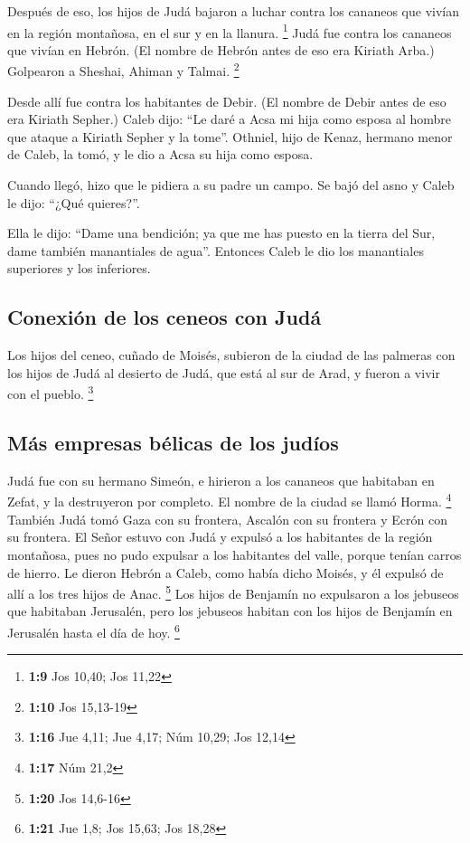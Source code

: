  Después de eso, los hijos de Judá bajaron a luchar contra
los cananeos que vivían en la región montañosa, en el sur y en la
llanura. \footnote{\textbf{1:9} Jos 10,40; Jos 11,22} 
Judá fue contra los cananeos que vivían en Hebrón. (El nombre de Hebrón
antes de eso era Kiriath Arba.) Golpearon a Sheshai, Ahiman y Talmai.
\footnote{\textbf{1:10} Jos 15,13-19}

 Desde allí fue contra los habitantes de Debir. (El
nombre de Debir antes de eso era Kiriath Sepher.)  Caleb
dijo: ``Le daré a Acsa mi hija como esposa al hombre que ataque a
Kiriath Sepher y la tome''.  Othniel, hijo de Kenaz,
hermano menor de Caleb, la tomó, y le dio a Acsa su hija como esposa.

 Cuando llegó, hizo que le pidiera a su padre un campo.
Se bajó del asno y Caleb le dijo: ``¿Qué quieres?''.

 Ella le dijo: ``Dame una bendición; ya que me has puesto
en la tierra del Sur, dame también manantiales de agua''. Entonces Caleb
le dio los manantiales superiores y los inferiores.

\hypertarget{conexiuxf3n-de-los-ceneos-con-juduxe1}{%
\subsection{Conexión de los ceneos con
Judá}\label{conexiuxf3n-de-los-ceneos-con-juduxe1}}

 Los hijos del ceneo, cuñado de Moisés, subieron de la
ciudad de las palmeras con los hijos de Judá al desierto de Judá, que
está al sur de Arad, y fueron a vivir con el pueblo. \footnote{\textbf{1:16}
  Jue 4,11; Jue 4,17; Núm 10,29; Jos 12,14}

\hypertarget{muxe1s-empresas-buxe9licas-de-los-juduxedos}{%
\subsection{Más empresas bélicas de los
judíos}\label{muxe1s-empresas-buxe9licas-de-los-juduxedos}}

 Judá fue con su hermano Simeón, e hirieron a los
cananeos que habitaban en Zefat, y la destruyeron por completo. El
nombre de la ciudad se llamó Horma. \footnote{\textbf{1:17} Núm 21,2}
 También Judá tomó Gaza con su frontera, Ascalón con su
frontera y Ecrón con su frontera.  El Señor estuvo con
Judá y expulsó a los habitantes de la región montañosa, pues no pudo
expulsar a los habitantes del valle, porque tenían carros de hierro.
 Le dieron Hebrón a Caleb, como había dicho Moisés, y él
expulsó de allí a los tres hijos de Anac. \footnote{\textbf{1:20} Jos
  14,6-16}  Los hijos de Benjamín no expulsaron a los
jebuseos que habitaban Jerusalén, pero los jebuseos habitan con los
hijos de Benjamín en Jerusalén hasta el día de hoy. \footnote{\textbf{1:21}
  Jue 1,8; Jos 15,63; Jos 18,28}

